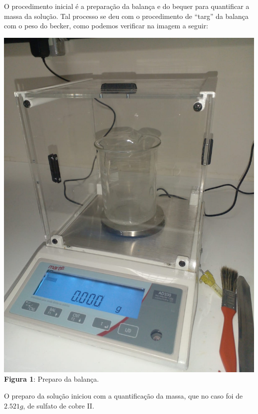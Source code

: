 \documentclass[a4paper, 11pt]{article}
\begin{document}
        \indent O procedimento inicial é a preparação da balança e do bequer para quantificar a massa da solução\@. Tal processo
        se deu com o procedimento de ``targ'' da balança com o peso do becker, como podemos verificar na imagem a seguir\@: \\
        \begin{center}
            \includegraphics[scale=0.2]{03. preparo da balanca.jpeg}\\
            \textbf{Figura 1}: Preparo da balança\@.
        \end{center}
        \doublespacing

\newpage

        \indent O preparo da solução iniciou com a quantificação da massa, que no caso foi de $2.521g$, de sulfato de cobre II\@.\\
\end{document}
